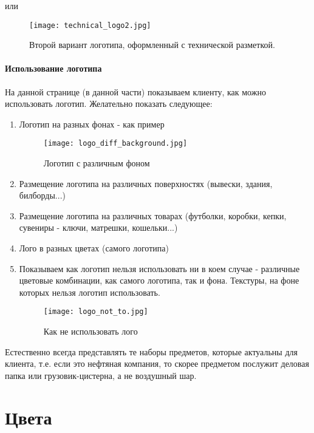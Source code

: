 \documentclass[DIV=calc, paper=a4, fontsize=11pt]{scrartcl} %
\begin{document}
    или
    
    \begin{figure}[H]
        \centering
        \texttt{[image: technical\_logo2.jpg]}
        \caption{Второй вариант логотипа, оформленный с технической разметкой. \label{technical_logo2.jpg}}
        \end{figure}
\paragraph{Использование логотипа}
На данной странице (в данной части) показываем клиенту, как можно использовать логотип. Желательно показать следующее:
    \begin{enumerate}
        \item Логотип на разных фонах - как пример
            \begin{figure}[H]
            \centering
            \texttt{[image: logo\_diff\_background.jpg]}
            \caption{Логотип с различным фоном \label{fig:logo_diff_background.jpg}}
            \end{figure}
        \item Размещение логотипа на различных поверхностях (вывески, здания, билборды...)
        \item Размещение логотипа на различных товарах (футболки, коробки, кепки, сувениры - ключи, матрешки, кошельки...)
        \item Лого в разных цветах (самого логотипа)
        \item Показываем как логотип нельзя использовать ни в коем случае - различные цветовые комбинации, как самого логотипа, так и фона. Текстуры, на фоне которых нельзя логотип использовать.
        \begin{figure}[H]
            \centering
            \texttt{[image: logo\_not\_to.jpg]}
            \caption{Как не использовать лого\label{fig:logo_not_to.jpg}}
            \end{figure}
    \end{enumerate}
Естественно всегда представлять те наборы предметов, которые актуальны для клиента, т.е. если это нефтяная компания, то скорее предметом послужит деловая папка или грузовик-цистерна, а не воздушный шар.


\section{Цвета}
\end{document}
